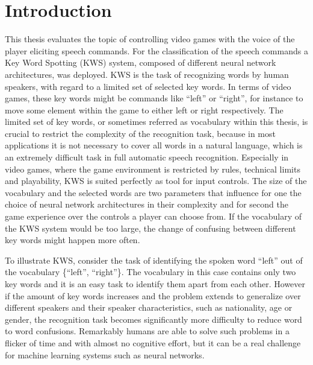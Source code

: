 
\chapter{Introduction}\label{sec:intro}
This thesis evaluates the topic of controlling video games with the voice of the player eliciting speech commands.
For the classification of the speech commands a Key Word Spotting (KWS) system, composed of different neural network architectures, was deployed.
KWS is the task of recognizing words by human speakers, with regard to a limited set of selected key words.
In terms of video games, these key words might be commands like \enquote{left} or \enquote{right}, for instance to move some element within the game to either left or right respectively.
The limited set of key words, or sometimes referred as vocabulary within this thesis, is crucial to restrict the complexity of the recognition task, because in most applications it is not necessary to cover all words in a natural language, which is an extremely difficult task in full automatic speech recognition.
Especially in video games, where the game environment is restricted by rules, technical limits and playability, KWS is suited perfectly as tool for input controls.
The size of the vocabulary and the selected words are two parameters that influence for one the choice of neural network architectures in their complexity and for second the game experience over the controls a player can choose from.
If the vocabulary of the KWS system would be too large, the change of confusing between different key words might happen more often.

To illustrate KWS, consider the task of identifying the spoken word \enquote{left} out of the vocabulary \{\enquote{left}, \enquote{right}\}.
The vocabulary in this case contains only two key words and it is an easy task to identify them apart from each other.
However if the amount of key words increases and the problem extends to generalize over different speakers and their speaker characteristics, such as nationality, age or gender, the recognition task becomes significantly more difficulty to reduce word to word confusions.
Remarkably humans are able to solve such problems in a flicker of time and with almost no cognitive effort, but it can be a real challenge for machine learning systems such as neural networks.

